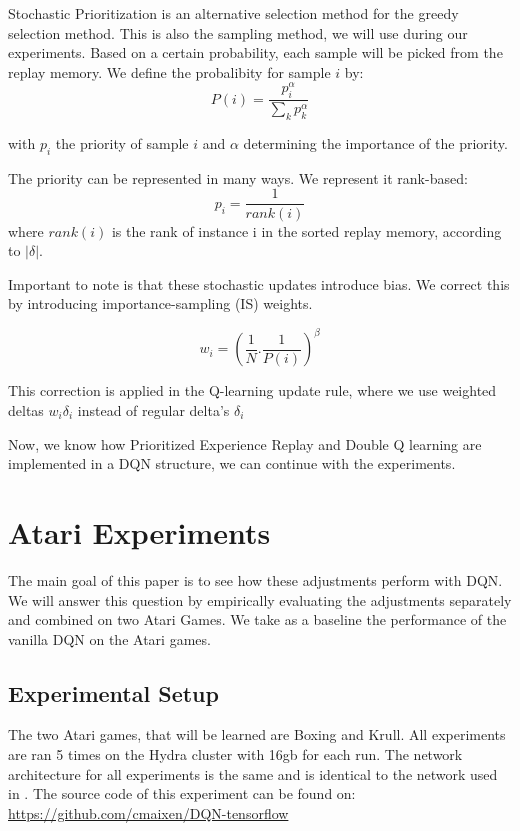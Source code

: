 \documentclass{sig-alternate}
\begin{document}
Stochastic Prioritization is an alternative selection method for the greedy selection method. This is also the sampling method, we will use during our experiments. Based on a certain probability, each sample will be picked from the replay memory. We define the probalibity for sample $i$ by:
\begin{equation}
P(i)=\frac{p_{i}^\alpha}{\sum_{k}{p_{k}^\alpha}}
\end{equation} 

with $p_i$ the priority of sample $i$ and $\alpha$ determining the importance of the priority.

The priority can be represented in many ways. We represent it rank-based:
\begin{equation}
p_i=\frac{1}{rank(i)} 
\end{equation}
where $rank(i)$ is the rank of instance i in the sorted replay memory, according to $|\delta|$.

Important to note is that these stochastic updates introduce bias. We correct this by introducing importance-sampling (IS) weights. \cite{schaul2015prioritized}

\begin{equation}
w_i=(\frac{1}{N}. \frac{1}{P(i)})^\beta 
\end{equation}

This correction is applied in the Q-learning update rule, where we use weighted deltas $w_i\delta_{i}$ instead of regular delta's $\delta_i$

Now, we know how Prioritized Experience Replay and Double Q learning are implemented in a DQN structure, we can continue with the experiments.
\section{Atari Experiments}

The main goal of this paper is to see how these adjustments perform with DQN. We will answer this question by empirically evaluating the adjustments separately and combined on two Atari Games. We take as a baseline the performance of the vanilla DQN on the Atari games.

\subsection{Experimental Setup}

The two Atari games, that will be learned are Boxing and Krull. All experiments are ran 5 times on the Hydra cluster with 16gb for each run. The network architecture for all experiments is the same and is identical to the network used in \cite{mnih2015human}. The source code of this experiment can be found on: \url{https://github.com/cmaixen/DQN-tensorflow}
\end{document}
